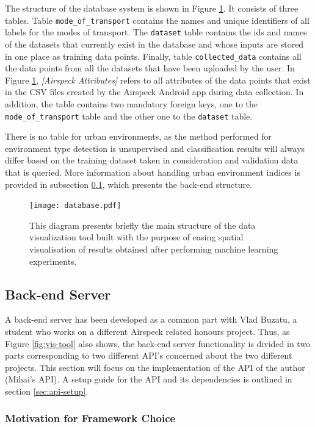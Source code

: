 \documentclass[bsc,frontabs,twoside,singlespacing, parskip,deptreport]{infthesis}     %
\begin{document}
The structure of the database system is shown in Figure \ref{fig:database}. It consists of three tables. Table \texttt{mode\_of\_transport} contains the names and unique identifiers of all labels for the modes of transport. The \texttt{dataset} table contains the ids and names of the datasets that currently exist in the database and whose inputs are stored in one place as training data points. Finally, table \texttt{collected\_data} contains all the data points from all the datasets that have been uploaded by the user. In Figure \ref{fig:database}, \textit{[Airspeck Attributes]} refers to all attributes of the data points that exist in the CSV files created by the Airspeck Android app during data collection. In addition, the table contains two mandatory foreign keys, one to the \texttt{mode\_of\_transport} table and the other one to the \texttt{dataset} table.

There is no table for urban environments, as the method performed for environment type detection is unsupervised and classification results will always differ based on the training dataset taken in consideration and validation data that is queried. More information about handling urban environment indices is provided in subsection \ref{subsec:back-end}, which presents the back-end structure.

\begin{figure}[h!]
  \center
  \texttt{[image: database.pdf]}
  \caption{This diagram presents briefly the main structure of the data visualization tool built with the purpose of easing spatial visualisation of results obtained after performing machine learning experiments.}
  \label{fig:database}
\end{figure}

\subsection{Back-end Server}
\label{subsec:back-end}

A back-end server has been developed as a common part with Vlad Buzatu, a student who works on a different Airspeck related honours project. Thus, as Figure \ref{fig:vis-tool} also shows, the back-end server functionality is divided in two parts corresponding to two different API's concerned about the two different projects. This section will focus on the implementation of the API of the author (Mihai's API). A setup guide for the API and its dependencies is outlined in section \ref{sec:api-setup}.

\subsubsection*{Motivation for Framework Choice}
\end{document}
